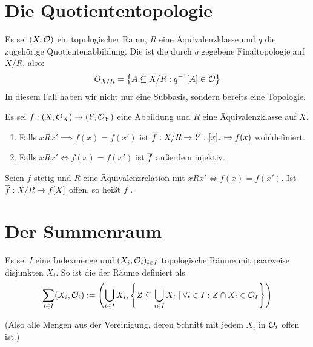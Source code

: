 \documentclass{report}
\begin{document}
\section{Die Quotiententopologie}
\begin{definition}
	Es sei $(X, \mathcal{O})$ ein topologischer Raum, $R$ eine Äquivalenzklasse und $q$ die zugehörige Quotientenabbildung. Die  ist die durch $q$ gegebene Finaltopologie auf $X/R$, also:
	\begin{align*}
		O_{X/R} = \qty{A \subseteq X/R : q^{-1}[A] \in \mathcal{O}}
	\end{align*}
	In diesem Fall haben wir nicht nur eine Subbasis, sondern bereits eine Topologie.
\end{definition}
\begin{lemma}
	Es sei $f : (X,\mathcal{O}_X) \to (Y, \mathcal{O}_Y)$ eine Abbildung und $R$ eine Äquivalenzklasse auf $X$.
	\begin{enumerate}
		\item 
		Falls $xRx' \implies f(x) = f(x')$ ist $\overline{{f}} : X/R \to Y : [x]_r \mapsto f(x)$ wohldefiniert.
		\item 
		Falls $xRx' \Longleftrightarrow f(x) = f(x')$ ist $\overline{{f}}$ außerdem injektiv.
	\end{enumerate}
\end{lemma}
\begin{definition}
	Seien $f$ stetig und $R$ eine Äquivalenzrelation mit $xRx' \Longleftrightarrow f(x) = f(x')$. Ist $\overline{{f}} : X/R \to f[X]$ offen, so heißt $f$ .
\end{definition}
\section{Der Summenraum}
\begin{definition}
	Es sei $I$ eine Indexmenge und $(X_i, \mathcal{O}_i)_{i \in I}$ topologische Räume mit paarweise disjunkten $X_i$. So ist die  der Räume definiert als
	\begin{align*}
		\sum_{i \in I} (X_i, \mathcal{O}_i) := \qty(\bigcup_{i \in I} X_i, \qty{Z  \subseteq \bigcup_{i \in I} X_i \mid \forall i \in I : Z \cap X_i \in \mathcal{O}_I})
	\end{align*}
\end{definition}
(Also alle Mengen aus der Vereinigung, deren Schnitt mit jedem $X_i$ in $\mathcal{O}_i$ offen ist.)
\end{document}
